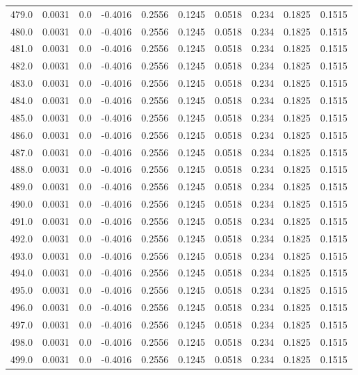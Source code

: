 \begin{longtable}{lrrrrrrrrr}
479.0 & 0.0031 & 0.0 & -0.4016 & 0.2556 & 0.1245 & 0.0518 & 0.234 & 0.1825 & 0.1515 \\
480.0 & 0.0031 & 0.0 & -0.4016 & 0.2556 & 0.1245 & 0.0518 & 0.234 & 0.1825 & 0.1515 \\
481.0 & 0.0031 & 0.0 & -0.4016 & 0.2556 & 0.1245 & 0.0518 & 0.234 & 0.1825 & 0.1515 \\
482.0 & 0.0031 & 0.0 & -0.4016 & 0.2556 & 0.1245 & 0.0518 & 0.234 & 0.1825 & 0.1515 \\
483.0 & 0.0031 & 0.0 & -0.4016 & 0.2556 & 0.1245 & 0.0518 & 0.234 & 0.1825 & 0.1515 \\
484.0 & 0.0031 & 0.0 & -0.4016 & 0.2556 & 0.1245 & 0.0518 & 0.234 & 0.1825 & 0.1515 \\
485.0 & 0.0031 & 0.0 & -0.4016 & 0.2556 & 0.1245 & 0.0518 & 0.234 & 0.1825 & 0.1515 \\
486.0 & 0.0031 & 0.0 & -0.4016 & 0.2556 & 0.1245 & 0.0518 & 0.234 & 0.1825 & 0.1515 \\
487.0 & 0.0031 & 0.0 & -0.4016 & 0.2556 & 0.1245 & 0.0518 & 0.234 & 0.1825 & 0.1515 \\
488.0 & 0.0031 & 0.0 & -0.4016 & 0.2556 & 0.1245 & 0.0518 & 0.234 & 0.1825 & 0.1515 \\
489.0 & 0.0031 & 0.0 & -0.4016 & 0.2556 & 0.1245 & 0.0518 & 0.234 & 0.1825 & 0.1515 \\
490.0 & 0.0031 & 0.0 & -0.4016 & 0.2556 & 0.1245 & 0.0518 & 0.234 & 0.1825 & 0.1515 \\
491.0 & 0.0031 & 0.0 & -0.4016 & 0.2556 & 0.1245 & 0.0518 & 0.234 & 0.1825 & 0.1515 \\
492.0 & 0.0031 & 0.0 & -0.4016 & 0.2556 & 0.1245 & 0.0518 & 0.234 & 0.1825 & 0.1515 \\
493.0 & 0.0031 & 0.0 & -0.4016 & 0.2556 & 0.1245 & 0.0518 & 0.234 & 0.1825 & 0.1515 \\
494.0 & 0.0031 & 0.0 & -0.4016 & 0.2556 & 0.1245 & 0.0518 & 0.234 & 0.1825 & 0.1515 \\
495.0 & 0.0031 & 0.0 & -0.4016 & 0.2556 & 0.1245 & 0.0518 & 0.234 & 0.1825 & 0.1515 \\
496.0 & 0.0031 & 0.0 & -0.4016 & 0.2556 & 0.1245 & 0.0518 & 0.234 & 0.1825 & 0.1515 \\
497.0 & 0.0031 & 0.0 & -0.4016 & 0.2556 & 0.1245 & 0.0518 & 0.234 & 0.1825 & 0.1515 \\
498.0 & 0.0031 & 0.0 & -0.4016 & 0.2556 & 0.1245 & 0.0518 & 0.234 & 0.1825 & 0.1515 \\
499.0 & 0.0031 & 0.0 & -0.4016 & 0.2556 & 0.1245 & 0.0518 & 0.234 & 0.1825 & 0.1515 \\

\end{longtable}
